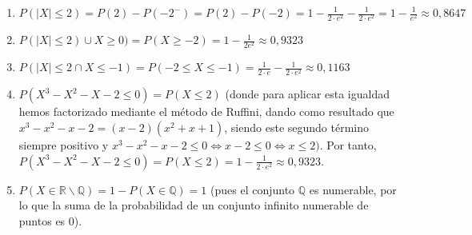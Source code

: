	\begin{enumerate}
		\item $P(|X| \leq 2) = P(2) - P(-2^-) = P(2) - P(-2) = 1 - \frac{1}{2·e^2} - \frac{1}{2·e^2} = 1 - \frac{1}{e^2} \approx 0,8647$
		
		\item $P(|X| \leq 2) \cup X \geq 0) = P(X \geq -2) = 1 - \frac{1}{2e^2} \approx 0,9323$
		
		\item $P(|X| \leq 2 \cap X \leq -1) = P(-2 \leq X \leq -1) = \frac{1}{2·e} - \frac{1}{2·e^2} \approx 0,1163$
		
		\item $P(X^3-X^2-X-2 \leq 0) = P(X \leq 2)$ (donde para aplicar esta igualdad hemos factorizado mediante el método de Ruffini, dando como resultado que $x^3-x^2-x-2 = (x-2)(x^2+x+1)$, siendo este segundo término siempre positivo y $x^3-x^2-x-2 \leq 0 \iff x-2 \leq 0 \iff x \leq 2)$. Por tanto, $P(X^3-X^2-X-2 \leq 0) = P(X \leq 2) = 1 - \frac{1}{2·e^2} \approx 0,9323$. 
		
		\item $P(X \in \mathbb{R} \backslash \mathbb{Q}) = 1 - P(X \in \mathbb{Q}) = 1$ (pues el conjunto $\mathbb{Q}$ es numerable, por lo que la suma de la probabilidad de un conjunto infinito numerable de puntos es 0). 
	\end{enumerate}

